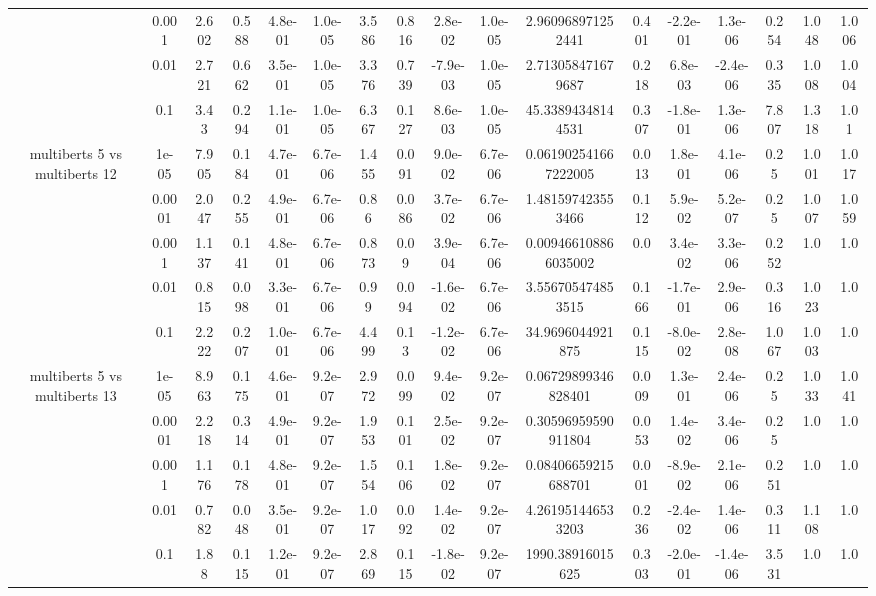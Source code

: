 \begin{tabular}{|c|c|c|c|c|c|c|c|c|c|c|c|c|c|c|c|c|}
 & 0.001 & 2.602 & 0.588 & 4.8e-01 & 1.0e-05 & 3.586 & 0.816 & 2.8e-02 & 1.0e-05 & 2.960968971252441 & 0.401 & -2.2e-01 & 1.3e-06 & 0.254 & 1.048 & 1.006 \\
 & 0.01 & 2.721 & 0.662 & 3.5e-01 & 1.0e-05 & 3.376 & 0.739 & -7.9e-03 & 1.0e-05 & 2.713058471679687 & 0.218 & 6.8e-03 & -2.4e-06 & 0.335 & 1.008 & 1.004 \\
 & 0.1 & 3.43 & 0.294 & 1.1e-01 & 1.0e-05 & 6.367 & 0.127 & 8.6e-03 & 1.0e-05 & 45.33894348144531 & 0.307 & -1.8e-01 & 1.3e-06 & 7.807 & 1.318 & 1.01 \\
\hline
\multirow{5}{*}{multiberts 5 vs multiberts 12} & 1e-05 & 7.905 & 0.184 & 4.7e-01 & 6.7e-06 & 1.455 & 0.091 & 9.0e-02 & 6.7e-06 & 0.061902541667222005 & 0.013 & 1.8e-01 & 4.1e-06 & 0.25 & 1.001 & 1.017 \\
 & 0.0001 & 2.047 & 0.255 & 4.9e-01 & 6.7e-06 & 0.86 & 0.086 & 3.7e-02 & 6.7e-06 & 1.481597423553466 & 0.112 & 5.9e-02 & 5.2e-07 & 0.25 & 1.007 & 1.059 \\
 & 0.001 & 1.137 & 0.141 & 4.8e-01 & 6.7e-06 & 0.873 & 0.09 & 3.9e-04 & 6.7e-06 & 0.009466108866035002 & 0.0 & 3.4e-02 & 3.3e-06 & 0.252 & 1.0 & 1.0 \\
 & 0.01 & 0.815 & 0.098 & 3.3e-01 & 6.7e-06 & 0.99 & 0.094 & -1.6e-02 & 6.7e-06 & 3.556705474853515 & 0.166 & -1.7e-01 & 2.9e-06 & 0.316 & 1.023 & 1.0 \\
 & 0.1 & 2.222 & 0.207 & 1.0e-01 & 6.7e-06 & 4.499 & 0.13 & -1.2e-02 & 6.7e-06 & 34.9696044921875 & 0.115 & -8.0e-02 & 2.8e-08 & 1.067 & 1.003 & 1.0 \\
\hline
\multirow{5}{*}{multiberts 5 vs multiberts 13} & 1e-05 & 8.963 & 0.175 & 4.6e-01 & 9.2e-07 & 2.972 & 0.099 & 9.4e-02 & 9.2e-07 & 0.06729899346828401 & 0.009 & 1.3e-01 & 2.4e-06 & 0.25 & 1.033 & 1.041 \\
 & 0.0001 & 2.218 & 0.314 & 4.9e-01 & 9.2e-07 & 1.953 & 0.101 & 2.5e-02 & 9.2e-07 & 0.30596959590911804 & 0.053 & 1.4e-02 & 3.4e-06 & 0.25 & 1.0 & 1.0 \\
 & 0.001 & 1.176 & 0.178 & 4.8e-01 & 9.2e-07 & 1.554 & 0.106 & 1.8e-02 & 9.2e-07 & 0.08406659215688701 & 0.001 & -8.9e-02 & 2.1e-06 & 0.251 & 1.0 & 1.0 \\
 & 0.01 & 0.782 & 0.048 & 3.5e-01 & 9.2e-07 & 1.017 & 0.092 & 1.4e-02 & 9.2e-07 & 4.261951446533203 & 0.236 & -2.4e-02 & 1.4e-06 & 0.311 & 1.108 & 1.0 \\
 & 0.1 & 1.88 & 0.115 & 1.2e-01 & 9.2e-07 & 2.869 & 0.115 & -1.8e-02 & 9.2e-07 & 1990.38916015625 & 0.303 & -2.0e-01 & -1.4e-06 & 3.531 & 1.0 & 1.0 \\

\end{tabular}
